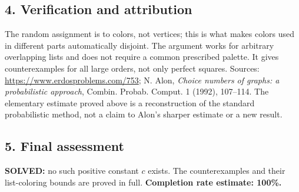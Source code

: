 \subsection*{4. Verification and attribution}
The random assignment is to colors, not vertices; this is what makes colors used in different parts automatically disjoint. The argument works for arbitrary overlapping lists and does not require a common prescribed palette. It gives counterexamples for all large orders, not only perfect squares.
Sources: \url{https://www.erdosproblems.com/753}; N. Alon, \emph{Choice numbers of graphs: a probabilistic approach}, Combin. Probab. Comput. 1 (1992), 107--114. The elementary estimate proved above is a reconstruction of the standard probabilistic method, not a claim to Alon's sharper estimate or a new result.
\subsection*{5. Final assessment}
\textbf{SOLVED:} no such positive constant $c$ exists. The counterexamples and their list-coloring bounds are proved in full.
\textbf{Completion rate estimate: 100\%.}

